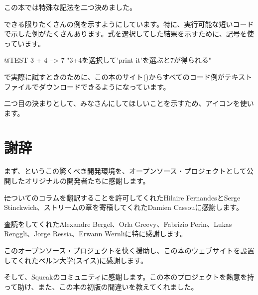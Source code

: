 \documentclass[a4paper,10pt,twoside]{book}
\begin{document}
この本では特殊な記法を二つ決めました。

できる限りたくさんの例を示すようにしています。特に、実行可能な短いコードで示した例がたくさんあります。式を選択してした結果を示すために、\ct{-->}記号を使っています。

\begin{code}{@TEST}
3 + 4 --> 7    "3+4を選択して'print it'を選ぶと7が得られる"
\end{code}
\pharo で実際に試すときのために、この本のサイト(\pbe)からすべてのコード例がテキストファイルでダウンロードできるようになっています。

二つ目の決まりとして、みなさんにしてほしいことを示すため、\dothisicon{}アイコンを使います。


\section*{謝辞}

まず、\squeak というこの驚くべき\st 開発環境を、オープンソース・プロジェクトとして公開したオリジナルの開発者たちに感謝します。

\st についてのコラムを翻訳することを許可してくれたHilaire FernandesとSerge Stinckwich、ストリームの章を寄稿してくれたDamien Cassouに感謝します。

査読をしてくれたAlexandre Bergel、Orla Greevy、Fabrizio Perin、Lukas Renggli、Jorge Ressia、Erwann Wernliに特に感謝します。

このオープンソース・プロジェクトを快く援助し、この本のウェブサイトを設置してくれたベルン大学(スイス)に感謝します。

そして、Squeakのコミュニティに感謝します。この本のプロジェクトを熱意を持って助け、また、この本の初版の間違いを教えてくれました。

\ifx\wholebook\relax\else
   
   
\end{document}
